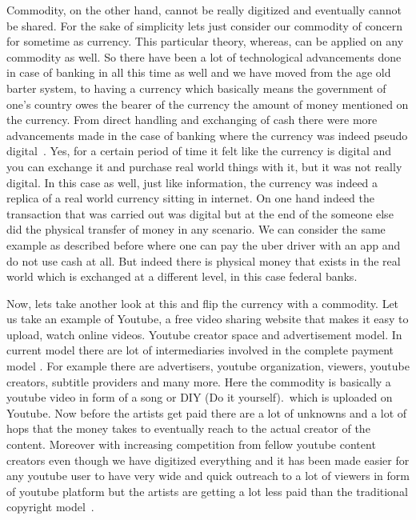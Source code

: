 Commodity, on the other hand, cannot be really digitized and
eventually cannot be shared. For the sake of simplicity lets just
consider our commodity of concern for sometime as currency. This
particular theory, whereas, can be applied on any commodity as well.
So there have been a lot of technological advancements done in case of
banking in all this time as well and we have moved from the age old
barter system, to having a currency which basically means the
government of one's country owes the bearer of the currency the amount
of money mentioned on the currency. From direct handling and
exchanging of cash there were more advancements made in the case of
banking where the currency was indeed pseudo digital~\cite{Chen7}.
Yes, for a certain period of time it felt like the currency is digital
and you can exchange it and purchase real world things with it, but it
was not really digital. In this case as well, just like information,
the currency was indeed a replica of a real world currency sitting in
internet. On one hand indeed the transaction that was carried out was
digital but at the end of the someone else did the physical transfer
of money in any scenario. We can consider the same example as
described before where one can pay the uber driver with an app and do
not use cash at all. But indeed there is physical money that exists in
the real world which is exchanged at a different level, in this case
federal banks.

Now, lets take another look at this and flip the currency with a
commodity. Let us take an example of Youtube,  a free
  video sharing website that makes it easy to upload, watch online
  videos. Youtube creator space and advertisement model. In current model
there are lot of intermediaries involved in the complete payment model
\cite{bryanm8}. For example there are advertisers, youtube
organization, viewers, youtube creators, subtitle providers and many
more. Here the commodity is basically a youtube video in form of a
song or DIY (Do it yourself).\ which is uploaded on Youtube. Now
before the artists get paid there are a lot of unknowns and a lot of
hops that the money takes to eventually reach to the actual creator of
the content. Moreover with increasing competition from fellow youtube
content creators even though we have digitized everything and it has
been made easier for any youtube user to have very wide and quick
outreach to a lot of viewers in form of youtube platform but the
artists are getting a lot less paid than the traditional copyright
model~\cite{tapscott1,helienne9}.



